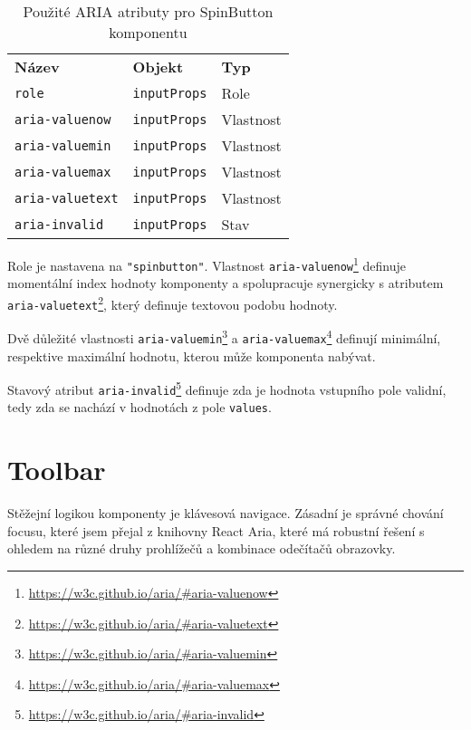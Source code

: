 \begin{table}[ht]
    \begin{ctucolortab}
        \begin{tabularx}{\textwidth}{X X X}
            \bfseries Název         & \bfseries Objekt    & \bfseries Typ \\\Midrule{}
            \texttt{role}           & \texttt{inputProps} & Role          \\
            \texttt{aria-valuenow}  & \texttt{inputProps} & Vlastnost     \\
            \texttt{aria-valuemin}  & \texttt{inputProps} & Vlastnost     \\
            \texttt{aria-valuemax}  & \texttt{inputProps} & Vlastnost     \\
            \texttt{aria-valuetext} & \texttt{inputProps} & Vlastnost     \\
            \texttt{aria-invalid}   & \texttt{inputProps} & Stav
        \end{tabularx}
    \end{ctucolortab}
    \caption{Použité ARIA atributy pro SpinButton komponentu}
    \label{table:spinbutton-aria}
\end{table}

Role je nastavena na \texttt{"spinbutton"}.
Vlastnost \texttt{aria-valuenow}\footnote{\url{https://w3c.github.io/aria/\#aria-valuenow}} definuje momentální index hodnoty komponenty a spolupracuje synergicky s atributem \texttt{aria-valuetext}\footnote{\url{https://w3c.github.io/aria/\#aria-valuetext}}, který definuje textovou podobu hodnoty.

Dvě důležité vlastnosti \texttt{aria-valuemin}\footnote{\url{https://w3c.github.io/aria/\#aria-valuemin}} a \texttt{aria-valuemax}\footnote{\url{https://w3c.github.io/aria/\#aria-valuemax}} definují minimální, respektive maximální hodnotu, kterou může komponenta nabývat.

Stavový atribut \texttt{aria-invalid}\footnote{\url{https://w3c.github.io/aria/\#aria-invalid}} definuje zda je hodnota vstupního pole validní, tedy zda se nachází v hodnotách z pole \texttt{values}.

\clearpage

\section{Toolbar}

Stěžejní logikou komponenty  je klávesová navigace.
Zásadní je správné chování focusu, které jsem přejal z knihovny React Aria, které má robustní řešení s ohledem na různé druhy prohlížečů a kombinace odečítačů obrazovky.

